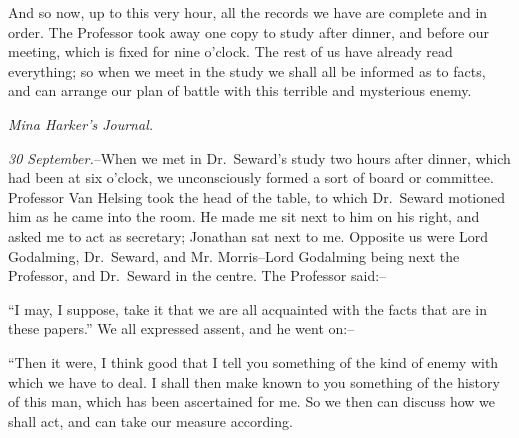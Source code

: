 \documentclass[12pt,openright]{book}
\begin{document}
And so now, up to this very hour, all the records we have are complete and in order. The Professor took away one copy to study after dinner, and before our meeting, which is fixed for nine o’clock. The rest of us have already read everything; so when we meet in the study we shall all be informed as to facts, and can arrange our plan of battle with this terrible and mysterious enemy.

\textit{Mina Harker’s Journal.}

\textit{30 September.}–When we met in Dr. Seward’s study two hours after dinner, which had been at six o’clock, we unconsciously formed a sort of board or committee. Professor Van Helsing took the head of the table, to which Dr. Seward motioned him as he came into the room. He made me sit next to him on his right, and asked me to act as secretary; Jonathan sat next to me. Opposite us were Lord Godalming, Dr. Seward, and Mr. Morris–Lord Godalming being next the Professor, and Dr. Seward in the centre. The Professor said:–

“I may, I suppose, take it that we are all acquainted with the facts that are in these papers.” We all expressed assent, and he went on:–

“Then it were, I think good that I tell you something of the kind of enemy with which we have to deal. I shall then make known to you something of the history of this man, which has been ascertained for me. So we then can discuss how we shall act, and can take our measure according.
\end{document}
